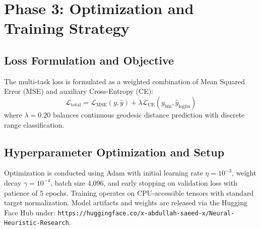
\section{Phase 3: Optimization and Training Strategy}

\subsection{Loss Formulation and Objective}
The multi-task loss is formulated as a weighted combination of Mean Squared Error (MSE)
and auxiliary Cross-Entropy (CE):
\begin{equation}
    \mathcal{L}_{\text{total}} = \mathcal{L}_{\text{MSE}}(y, \hat{y}) + \lambda \mathcal{L}_{\text{CE}}(y_{\text{bin}}, \hat{y}_{\text{logits}})
\end{equation}
where $\lambda = 0.20$ balances continuous geodesic distance prediction with discrete range classification.

\subsection{Hyperparameter Optimization and Setup}
Optimization is conducted using Adam with initial learning rate $\eta = 10^{-3}$, weight decay
$\gamma = 10^{-4}$, batch size 4,096, and early stopping on validation loss with patience of 5 epochs.
Training operates on CPU-accessible tensors with standard target normalization.
Model artifacts and weights are released via the Hugging Face Hub under:
\texttt{https://huggingface.co/x-abdullah-saeed-x/Neural-Heuristic-Research}.
